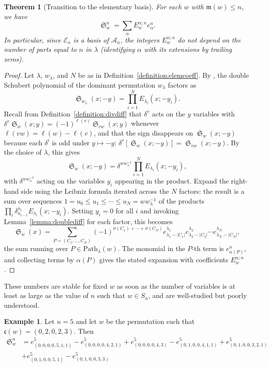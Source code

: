 \documentclass{amsart}
\newtheorem{theorem}{Theorem}[section]
\theoremstyle{definition}
\newtheorem{example}[lemma]{Example}
\theoremstyle{remark}
\numberwithin{equation}{subsection}
\DeclareMathOperator{\sch}{\mathfrak{S}}
\newcommand{\coma}{\mathcal{A}}
\newcommand{\code}{\mathfrak{c}}
\newcommand{\maxd}{\mathfrak{m}}
\begin{document}
\begin{theorem}[Transition to the elementary basis] \label{theorem:elemtrans}
	For each $w$ with $\maxd(w)\leq n$, we have
	$$\sch_w^n = \sum_{\alpha}E_w^{\alpha;n}e_{\alpha}^n.$$
In particular, since $\mathcal{E}_n$ is a basis of $\coma_n$, the integers $E_w^{\alpha;n}$ do not depend on the number of parts equal to $n$ in $\lambda$ (identifying $\alpha$ with its extensions by trailing zeros).
\end{theorem}
\begin{proof}
Let $\lambda$, $w_\lambda$, and $N$ be as in Definition~\ref{definition:elemcoeff}. By \cite[(6.14)]{notes}, the double Schubert polynomial of the dominant permutation $w_\lambda$ factors as
$$\sch_{w_{\lambda}}(x;-y)=\prod_{i=1}^N E_{\lambda_i}(x;-y_i).$$
Recall from Definition~\ref{definition:divdiff} that $\delta^v$ acts on the $y$ variables with $\delta^v\sch_w(x;y)=(-1)^{\ell(v)}\sch_{vw}(x;y)$ whenever $\ell(vw)=\ell(w)-\ell(v)$, and that the sign disappears on $\sch_w(x;-y)$ because each $\delta^i$ is odd under $y\mapsto -y$: $\delta^v[\sch_w(x;-y)]=\sch_{vw}(x;-y)$. By the choice of $\lambda$, this gives
$$\sch_w(x;-y) = \delta^{ww_\lambda^{-1}}\prod_{i=1}^N E_{\lambda_i}(x;-y_i),$$
with $\delta^{ww_\lambda^{-1}}$ acting on the variables $y_i$ appearing in the product.
Expand the right-hand side using the Leibniz formula iterated across the $N$ factors: the result is a sum over sequences $1=u_0\leq u_1\leq\cdots\leq u_N=ww_\lambda^{-1}$ of the products $\prod_i\delta_{u_{i-1}}^{u_i}E_{\lambda_i}(x;-y_i)$. Setting $y_i=0$ for all $i$ and invoking Lemma~\ref{lemma:doublediff} for each factor, this becomes
$$\sch_w(x)=\sum_{P=(C_1,\ldots,C_N)}(-1)^{\sigma(C_1)+\cdots+\sigma(C_N)}e_{\lambda_{1}-|C_1|}^{\lambda_1}e_{\lambda_2-|C_2|}^{\lambda_2}\cdots e_{\lambda_{N}-|C_{N}|}^{\lambda_{N}},$$
the sum running over $P\in\mathrm{Path}_\lambda(w)$. The monomial in the $P$-th term is $e_{\alpha(P)}^n$, and collecting terms by $\alpha(P)$ gives the stated expansion with coefficients $E_w^{\alpha;n}$.
\end{proof}
These numbers are stable for fixed $w$ as soon as the number of variables is at least as large as the value of $n$ such that $w\in S_n$, and are well-studied but poorly understood.

\begin{example}
	Let $n=5$ and let $w$ be the permutation such that $\code(w)=(0,2,0,2,3)$. Then
	\begin{align*}
		\sch_w^n &= e^5_{(0,0,0,0,5,1,1)} - e^5_{(0,0,0,0,4,2,1)} + e^5_{(0,0,0,0,4,3)}- e^5_{(0,1,0,0,4,1,1)} +e^5_{(0,1,0,0,3,2,1)}\\
		&+e^5_{(0,1,0,0,5,1)} - e^5_{(0,1,0,0,3,3)}
	\end{align*}
\end{example}
\end{document}
